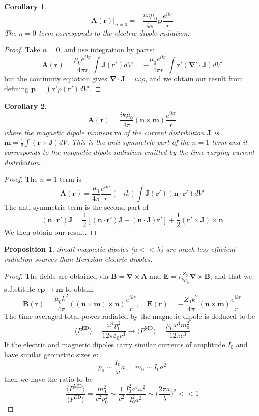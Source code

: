 \documentclass[a4paper]{article}
\theoremstyle{new}
\newtheorem{prop}{Proposition}[section]
\newtheorem{cor}{Corollary}[section]
\begin{document}
\begin{cor}
$$\mathbf{A}(\mathbf{r})|_{n=0}=-\frac{i\omega\mu_0}{4\pi}\mathbf{p}\frac{e^{ikr}}{r}$$
The $n=0$ term corresponds to the electric dipole radiation.
\end{cor}
\begin{proof}
Take $n=0$, and use integration by parts:
$$\mathbf{A}(\mathbf{r})=\frac{\mu_0e^{ikr}}{4\pi r}\int\mathbf{J}(\mathbf{r'})dV'=-\frac{\mu_0e^{ikr}}{4\pi r}\int\mathbf{r'}(\boldsymbol{\nabla'}\cdot\mathbf{J})dV'$$
but the continuity equation gives $\boldsymbol{\nabla}\cdot\mathbf{J}=i\omega\rho$, and we obtain our result from defining $\mathbf{p}=\int\mathbf{r'}\rho(\mathbf{r'})dV'$.
\end{proof}
\begin{cor}
$$\mathbf{A}(\mathbf{r})=\frac{ik\mu_0}{4\pi}(\mathbf{n}\times\mathbf{m})\frac{e^{ikr}}{r}$$
where the magnetic dipole moment $\mathbf{m}$ of the current distribution $\mathbf{J}$ is $\mathbf{m}=\frac{1}{2}\int(\mathbf{r}\times\mathbf{J})dV$. This is the anti-symmetric part of the $n=1$ term and it corresponds to the magnetic dipole radiation emitted by the time-varying current distribution.
\end{cor}
\begin{proof}
The $n=1$ term is
$$\mathbf{A}(\mathbf{r})=\frac{\mu_0}{4\pi}\frac{e^{ikr}}{r}(-ik)\int\mathbf{J}(\mathbf{r'})(\mathbf{n}\cdot\mathbf{r'})dV'$$
The anti-symmetric term is the second part of 
$$(\mathbf{n}\cdot\mathbf{r'})\mathbf{J}=\frac{1}{2}[(\mathbf{n}\cdot\mathbf{r'})\mathbf{J}+(\mathbf{n}\cdot\mathbf{J})\mathbf{r'}]+\frac{1}{2}(\mathbf{r'}\times\mathbf{J})\times\mathbf{n}$$
We then obtain our result.
\end{proof}
\begin{prop}
Small magnetic dipoles ($a<<\lambda$) are much less efficient radiation sources than Hertzian electric dipoles.
\end{prop}
\begin{proof}
The fields are obtained via $\mathbf{B}=\boldsymbol{\nabla}\times\mathbf{A}$ and $\mathbf{E}=i\frac{Z_0}{k\mu_0}\boldsymbol{\nabla}\times\mathbf{B}$, and that we substitute $c\mathbf{p}\rightarrow\mathbf{m}$ to obtain
$$\mathbf{B}(\mathbf{r})=\frac{\mu_0k^2}{4\pi}((\mathbf{n}\times\mathbf{m})\times\mathbf{n})\frac{e^{ikr}}{r},\quad\mathbf{E}(\mathbf{r})=-\frac{Z_0k^2}{4\pi}(\mathbf{n}\times\mathbf{m})\frac{e^{ikr}}{r}$$
The time averaged total power radiated by the magnetic dipole is deduced to be
$$\langle P^{\text{ED}}\rangle=\frac{\omega^4p_0^2}{12\pi\varepsilon_0c^3}\rightarrow\langle P^{\text{MD}}\rangle=\frac{\mu_0\omega^4m_0^2}{12\pi c^3}$$
If the electric and magnetic dipoles carry similar currents of amplitude $I_0$ and have similar geometric sizes $a$:
$$p_0\sim\frac{I_0}{\omega}a,\quad m_0\sim I_0a^2$$
then we have the ratio to be
$$\frac{\langle P^{\text{MD}}\rangle}{\langle P^{\text{ED}}\rangle}=\frac{m_0^2}{c^2p_0^2}\sim\frac{1}{c^2}\frac{I_0^2a^4\omega^2}{I_0^2a^2}\sim\bigg(\frac{2\pi a}{\lambda}\bigg)^2<<1$$
\end{proof}
\end{document}
